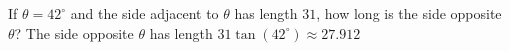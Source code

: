 {If $\theta = 42^{\circ}$ and the side adjacent to $\theta$ has length $31$, how long is the side opposite $\theta$?}
{The side opposite $\theta$ has length $31\tan(42^{\circ}) \approx 27.912$}